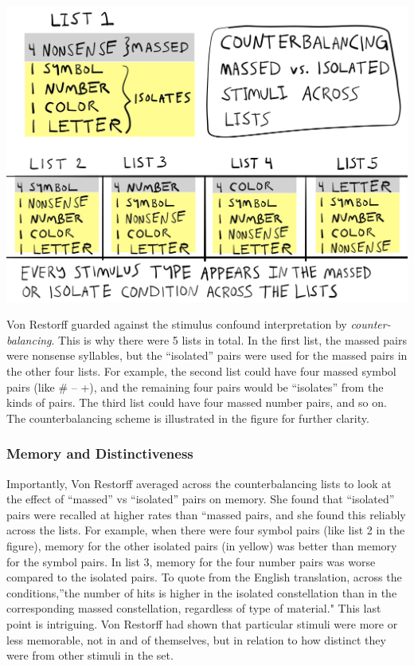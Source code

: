 \documentclass[
  oneside,
  12pt]{crumpbook}
\newenvironment{floatright50}{%
  \wrapfigure{R}{.5\textwidth}%
  }{%
  \endwrapfigure}
\begin{document}
\begin{floatright50}
\includegraphics[width=1\linewidth]{imgs/Von_Restorff_counterbalance}

\end{floatright50}

Von Restorff guarded against the stimulus confound interpretation by \emph{counter-balancing}. This is why there were 5 lists in total. In the first list, the massed pairs were nonsense syllables, but the ``isolated'' pairs were used for the massed pairs in the other four lists. For example, the second list could have four massed symbol pairs (like \# -- +), and the remaining four pairs would be ``isolates'' from the kinds of pairs. The third list could have four massed number pairs, and so on. The counterbalancing scheme is illustrated in the figure for further clarity.

\hypertarget{memory-and-distinctiveness}{%
\subsubsection{Memory and Distinctiveness}\label{memory-and-distinctiveness}}

Importantly, Von Restorff averaged across the counterbalancing lists to look at the effect of ``massed'' vs ``isolated'' pairs on memory. She found that ``isolated'' pairs were recalled at higher rates than ``massed pairs, and she found this reliably across the lists. For example, when there were four symbol pairs (like list 2 in the figure), memory for the other isolated pairs (in yellow) was better than memory for the symbol pairs. In list 3, memory for the four number pairs was worse compared to the isolated pairs. To quote from the English translation, across the conditions,''the number of hits is higher in the isolated constellation than in the corresponding massed constellation, regardless of type of material." This last point is intriguing. Von Restorff had shown that particular stimuli were more or less memorable, not in and of themselves, but in relation to how distinct they were from other stimuli in the set.
\end{document}
